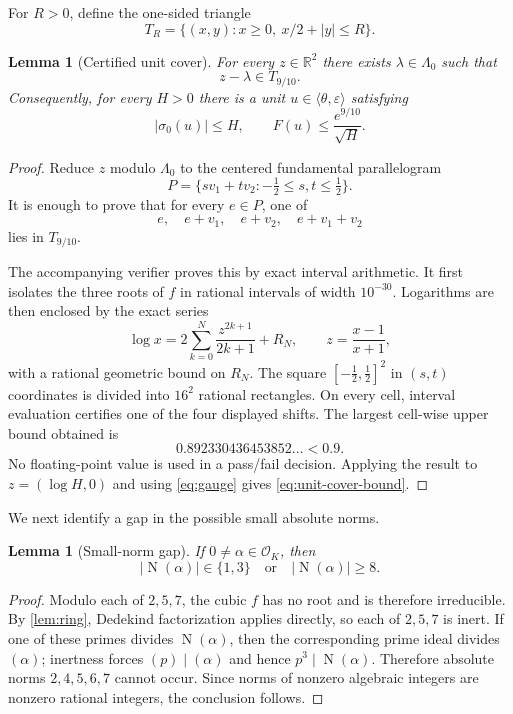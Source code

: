 \documentclass[11pt]{article}
\newtheorem{lemma}[theorem]{Lemma}
\theoremstyle{definition}
\newcommand{\R}{\mathbb R}
\newcommand{\OK}{\mathcal O_K}
\DeclareMathOperator{\Nm}{N}
\begin{document}
For $R>0$, define the one-sided triangle
\[
T_R=\{(x,y):x\ge0,\ x/2+|y|\le R\}.
\]

\begin{lemma}[Certified unit cover]\label{lem:cover}
For every $z\in\R^2$ there exists $\lambda\in\Lambda_0$ such that
\[
z-\lambda\in T_{9/10}.
\]
Consequently, for every $H>0$ there is a unit $u\in\langle\theta,\varepsilon\rangle$ satisfying
\begin{equation}\label{eq:unit-cover-bound}
|\sigma_0(u)|\le H,
\qquad
F(u)\le \frac{e^{9/10}}{\sqrt H}.
\end{equation}
\end{lemma}

\begin{proof}
Reduce $z$ modulo $\Lambda_0$ to the centered fundamental parallelogram
\[
P=\{s v_1+t v_2:-\tfrac12\le s,t\le\tfrac12\}.
\]
It is enough to prove that for every $e\in P$, one of
\[
e,\quad e+v_1,\quad e+v_2,\quad e+v_1+v_2
\]
lies in $T_{9/10}$.

The accompanying verifier proves this by exact interval arithmetic.  It first isolates the three roots of $f$ in rational intervals of width $10^{-30}$.  Logarithms are then enclosed by the exact series
\[
\log x=2\sum_{k=0}^{N}\frac{z^{2k+1}}{2k+1}+R_N,
\qquad z=\frac{x-1}{x+1},
\]
with a rational geometric bound on $R_N$.  The square
$[-\tfrac12,\tfrac12]^2$ in $(s,t)$ coordinates is divided into $16^2$ rational rectangles.  On every cell, interval evaluation certifies one of the four displayed shifts.  The largest cell-wise upper bound obtained is
\[
0.892330436453852\ldots<0.9.
\]
No floating-point value is used in a pass/fail decision.  Applying the result to $z=(\log H,0)$ and using \eqref{eq:gauge} gives \eqref{eq:unit-cover-bound}.
\end{proof}

We next identify a gap in the possible small absolute norms.

\begin{lemma}[Small-norm gap]\label{lem:norm-gap}
If $0\ne\alpha\in\OK$, then
\[
|\Nm(\alpha)|\in\{1,3\}\quad\text{or}\quad |\Nm(\alpha)|\ge8.
\]
\end{lemma}
\begin{proof}
Modulo each of $2,5,7$, the cubic $f$ has no root and is therefore irreducible.  By \cref{lem:ring}, Dedekind factorization applies directly, so each of $2,5,7$ is inert.  If one of these primes divides $\Nm(\alpha)$, then the corresponding prime ideal divides $(\alpha)$; inertness forces $(p)\mid(\alpha)$ and hence $p^3\mid\Nm(\alpha)$.  Therefore absolute norms $2,4,5,6,7$ cannot occur.  Since norms of nonzero algebraic integers are nonzero rational integers, the conclusion follows.
\end{proof}
\end{document}
